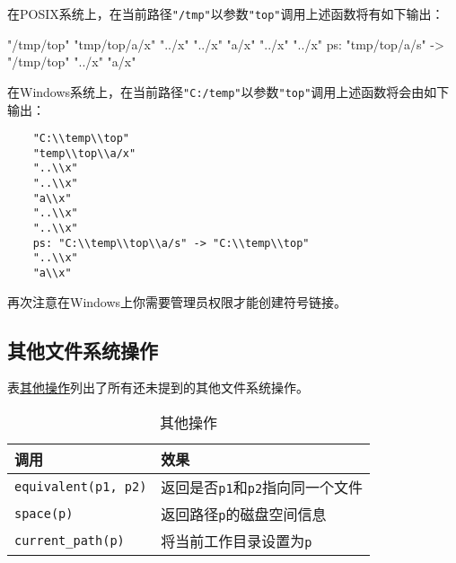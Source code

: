 在POSIX系统上，在当前路径\texttt{"/tmp"}以参数\texttt{"top"}调用上述函数将有如下输出：
\begin{blacklisting}
    "/tmp/top"
    "tmp/top/a/x"
    "../x"
    "../x"
    "a/x"
    "../x"
    "../x"
    ps: "tmp/top/a/s" -> "/tmp/top"
    "../x"
    "a/x"
\end{blacklisting}
在Windows系统上，在当前路径\texttt{"C:/temp"}以参数\texttt{"top"}调用上述函数将会由如下输出：
\begin{lstlisting}
    "C:\\temp\\top"
    "temp\\top\\a/x"
    "..\\x"
    "..\\x"
    "a\\x"
    "..\\x"
    "..\\x"
    ps: "C:\\temp\\top\\a/s" -> "C:\\temp\\top"
    "..\\x"
    "a\\x"
\end{lstlisting}
再次注意在Windows上你需要管理员权限才能创建符号链接。

\subsection{其他文件系统操作}\label{ch20.4.6}
表\hyperref[t20.20]{其他操作}列出了所有还未提到的其他文件系统操作。
\begin{table}[htb]
    \centering
    \begin{tabular}{l|l}
        \hline
        \textbf{调用}                 & \textbf{效果}                        \\
        \hline
        \texttt{equivalent(p1, p2)} & 返回是否\texttt{p1}和\texttt{p2}指向同一个文件 \\
        \texttt{space(p)}           & 返回路径\texttt{p}的磁盘空间信息              \\
        \texttt{current\_path(p)}   & 将当前工作目录设置为\texttt{p}               \\
        \hline
    \end{tabular}
    \caption{其他操作}
    \label{t20.20}
\end{table}

